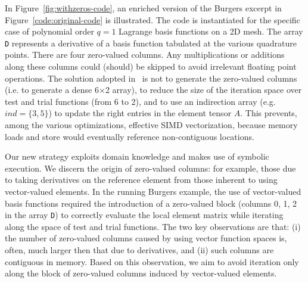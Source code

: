 In Figure~\ref{fig:withzeros-code}, an enriched version of the Burgers excerpt in Figure~\ref{code:original-code} is illustrated. The code is instantiated for the specific case of polynomial order $q=1$ Lagrange basis functions on a 2D mesh. The array \texttt{D} represents a derivative of a basis function tabulated at the various quadrature points. There are four zero-valued columns. Any multiplications or additions along these columns could (should) be skipped to avoid irrelevant floating point operations. The solution adopted in~\cite{quadrature-olegaard} is not to generate the zero-valued columns (i.e. to generate a dense 6$\times$2 array), to reduce the size of the iteration space over test and trial functions (from 6 to 2), and to use an indirection array (e.g. $ind = \lbrace 3, 5\rbrace$) to update the right entries in the element tensor $A$. This prevents, among the various optimizations, effective SIMD vectorization, because memory loads and store would eventually reference non-contiguous locations. 

Our new strategy exploits domain knowledge and makes use of symbolic execution. We discern the origin of zero-valued columns: for example, those due to taking derivatives on the reference element from those inherent to using vector-valued elements. In the running Burgers example, the use of vector-valued basis functions required the introduction of a zero-valued block (columns 0, 1, 2 in the array \texttt{D}) to correctly evaluate the local element matrix while iterating along the space of test and trial functions. The two key observations are that: (i) the number of zero-valued columns caused by using vector function spaces is, often, much larger then that due to derivatives, and (ii) such columns are contiguous in memory. Based on this observation, we aim to avoid iteration only along the block of zero-valued columns induced by vector-valued elements. 


